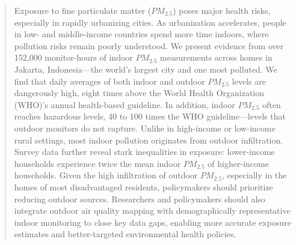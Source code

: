 \documentclass[9pt,twocolumn,twoside]{pnas-new}
\begin{document}
\begin{abstract}
Exposure to fine particulate matter ($PM_{2.5}$) poses major health risks, especially in rapidly urbanizing cities. As urbanization accelerates, people in low- and middle-income countries spend more time indoors, where pollution risks remain poorly understood. We present evidence from over 152,000 monitor-hours of indoor $PM_{2.5}$ measurements across homes in Jakarta, Indonesia—the world’s largest city and one most polluted. We find that daily averages of both indoor and outdoor $PM_{2.5}$ levels are dangerously high, eight times above the World Health Organization (WHO)'s annual health-based guideline. In addition, indoor  $PM_{2.5}$ often reaches hazardous levels, 40 to 100 times the WHO guideline—levels that outdoor monitors do not capture. Unlike in high-income or low-income rural settings, most indoor pollution originates from outdoor infiltration. Survey data further reveal stark inequalities in exposure: lower-income households experience twice the mean indoor $PM_{2.5}$ of higher-income households. 
Given the high infiltration of outdoor $PM_{2.5}$, especially in the homes of most disadvantaged residents, policymakers should prioritize reducing outdoor sources.
Researchers and policymakers should also integrate outdoor air quality mapping with demographically representative indoor monitoring to close key data gaps, enabling more accurate exposure estimates and better-targeted environmental health policies.
\end{abstract}



\maketitle
\thispagestyle{firststyle}



\end{document}
